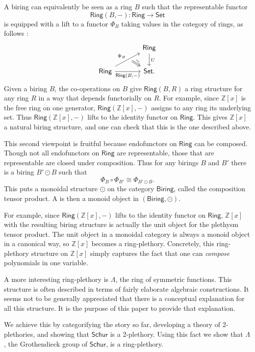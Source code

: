 \documentclass[12pt,reqno]{amsart}
\theoremstyle{plain}
\theoremstyle{definition}
\theoremstyle{remark}
\newcommand{\define}[1]{{\bf \boldmath{#1}}\index{#1}}
\newcommand{\maps}{\colon}
\newcommand{\Z}{\mathbb Z}
\newcommand{\namedcat}[1]{\mathsf{#1}}
\newcommand{\Biring}{\namedcat{Biring}}
\newcommand{\Ring}{\namedcat{Ring}}
\newcommand{\Set}{\namedcat{Set}}
\newcommand{\Schur}{\namedcat{Schur}}
\numberwithin{thm}{section}
\begin{document}
A biring can equivalently be seen as a ring $B$ such that the representable functor 
\[
    \Ring(B, -) \maps \Ring \to \Set
\]
is equipped with a lift to a functor $\Phi_B$ taking values in the category of rings, as follows \cite{TallWraith}:
\[
\begin{tikzcd}[column sep = large]
    &
    \Ring
    \arrow[d, "U"]
    \\
    \Ring
    \arrow[ur, "\Phi_B"]
    \arrow[ur, swap, ""{name = phi}, phantom, bend right = 5, pos = 0.6]
    \arrow[r, swap, "{\Ring(B, -)}"]
    \arrow[from = phi, r, Rightarrow, "\sim", sloped]
    &
    \Set.
\end{tikzcd}
\] 
Given a biring $B$, the co-operations on $B$ give $\Ring(B, R)$ a ring structure for any ring $R$ in a way that depends functorially on $R$. For example, since $\Z[x]$ is the free ring on one generator, $\Ring(\Z[x], -)$ assigns to any ring its underlying set. Thus $\Ring(\Z[x], -)$ lifts to the identity functor on $\Ring$. This gives $\Z[x]$ a natural biring structure, and one can check that this is the one described above. 

This second viewpoint is fruitful because endofunctors on $\Ring$ can be composed. Though not all endofunctors on $\Ring$ are representable, those that are representable are closed under composition. Thus for any birings $B$ and $B'$ there is a biring $B' \odot B$ such that
\[
    \Phi_B \circ \Phi_{B'} \cong \Phi_{B' \odot B}. 
\]
This puts a monoidal structure $\odot$ on the category $\Biring$, called the composition tensor product. A \define{ring-plethory} is then a monoid object in $(\Biring, \odot)$. 

For example, since $\Ring(\Z[x], -)$ lifts to the identity functor on $\Ring$, $\Z[x]$ with the resulting biring structure is actually the unit object for the plethysm tensor product. The unit object in a monoidal category is always a monoid object in a canonical way, so $\Z[x]$ becomes a ring-plethory. Concretely, this ring-plethory structure on $\Z[x]$ simply captures the fact that one can \emph{compose} polynomials in one variable. 

A more interesting ring-plethory is $\Lambda$, the ring of symmetric functions. This structure is often described in terms of fairly elaborate algebraic constructions. It seems not to be generally appreciated that there is a  conceptual explanation for all this structure. It is the purpose of this paper to provide that explanation. 

We achieve this by categorifying the story so far, developing a theory of 2-plethories, and showing that $\Schur$ is a 2-plethory. Using this fact we show that $\Lambda$, the Grothendieck group of $\Schur$, is a ring-plethory. 
\end{document}
